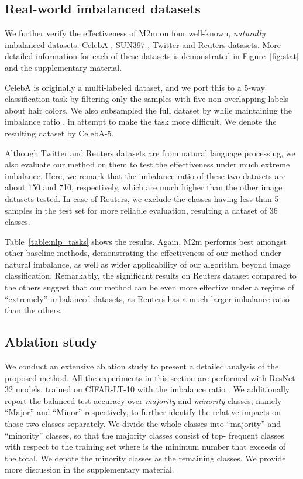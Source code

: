 \vspace{-0.02in}
\subsection{Real-world imbalanced datasets}
\label{ss:real}

We further verify the effectiveness of M2m on four well-known, \emph{naturally} imbalanced datasets: 
CelebA \citep{liu2015faceattributes}, SUN397 \citep{xiao2010sun}, Twitter \citep{gimpel2010part} and Reuters \citep{lewis2004rcv1} datasets. More detailed information for each of these datasets is demonstrated in Figure~\ref{fig:stat} and the supplementary material.

CelebA is originally a multi-labeled dataset, and we port this to a 5-way classification task by filtering only the samples with five non-overlapping labels about hair colors. We also subsampled the full dataset by  while maintaining the imbalance ratio , in attempt to make the task more difficult. We denote the resulting dataset by CelebA-5.

Although Twitter and Reuters datasets are from natural language processing, we also evaluate our method on them to test the effectiveness under much extreme imbalance. Here, we remark that the imbalance ratio  of these two datasets are about 150 and 710, respectively, which are much higher than the other image datasets tested. In case of Reuters, we exclude the classes having less than 5 samples in the test set for more reliable evaluation, resulting a dataset of 36 classes. 

Table~\ref{table:nlp_tasks} shows the results. Again, M2m performs best amongst other baseline methods, demonstrating the effectiveness of our method under natural imbalance, as well as {wider} applicability of our algorithm beyond image classification. Remarkably, the significant results on Reuters dataset compared to the others suggest that our method can be even more effective under a regime of ``extremely'' imbalanced datasets, as Reuters has a much larger imbalance ratio than the others.


\subsection{Ablation study}
\label{ss:ablation}

We conduct an extensive ablation study to present a detailed analysis of the proposed method. All the experiments in this section are performed with ResNet-32 models, trained on CIFAR-LT-10 with the imbalance ratio . We additionally report the balanced test accuracy over \emph{majority} and \emph{minority} classes, namely ``Major'' and ``Minor'' respectively, to further identify the relative impacts on those two classes separately. We divide the whole classes into ``majority'' and ``minority'' classes, so that the majority classes consist of top- frequent classes with respect to the training set where  is the minimum number that  exceeds  of the total. We denote the minority classes as the remaining classes. We provide more discussion in the supplementary material.

